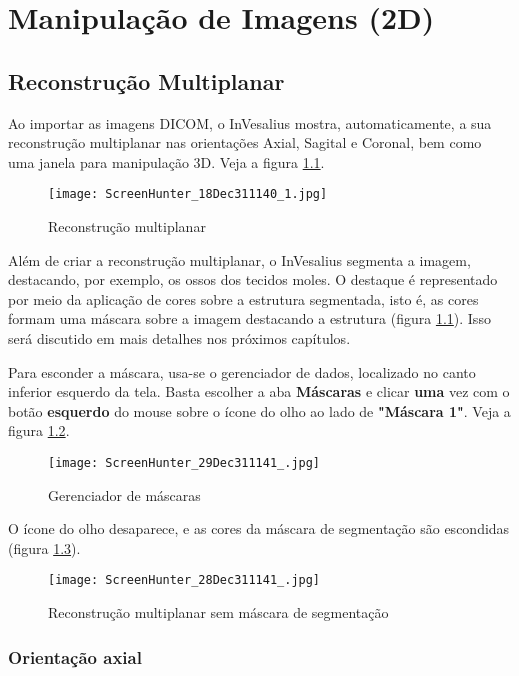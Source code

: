 \chapter{Manipulação de Imagens (2D)}

\section{Reconstrução Multiplanar}

Ao importar as imagens DICOM, o InVesalius mostra, automaticamente, a sua reconstrução
multiplanar nas orientações Axial, Sagital e Coronal, bem como uma janela para manipulação 3D.
Veja a figura \ref{fig:mpr}.

\begin{figure}[!htb]
\centering
\texttt{[image: ScreenHunter\_18Dec311140\_1.jpg]}
\caption{Reconstrução multiplanar}
\label{fig:mpr}
\end{figure}

\newpage

Além de criar a reconstrução multiplanar, o InVesalius segmenta a imagem, destacando, por exemplo, os
ossos dos tecidos moles. O destaque é representado por meio da aplicação de cores sobre a estrutura
segmentada, isto é, as cores formam uma máscara sobre a imagem destacando a estrutura (figura
\ref{fig:mpr}). Isso será discutido em mais detalhes nos próximos capítulos.

Para esconder a máscara, usa-se o gerenciador de dados, localizado no canto inferior esquerdo
da tela. Basta escolher a aba \textbf{Máscaras} e clicar \textbf{uma} vez com o botão
\textbf{esquerdo} do mouse sobre o ícone do olho ao lado de \textbf{"Máscara 1"}. Veja a figura
\ref{fig:ger_masc}.

\begin{figure}[!htb]
\centering
\texttt{[image: ScreenHunter\_29Dec311141\_.jpg]}
\caption{Gerenciador de máscaras}
\label{fig:ger_masc}
\end{figure}

O ícone do olho desaparece, e as cores da máscara de segmentação são escondidas (figura
\ref{fig:mpr_sem_mask}).

\begin{figure}[!htb]
\centering
\texttt{[image: ScreenHunter\_28Dec311141\_.jpg]}
\caption{Reconstrução multiplanar sem máscara de segmentação}
\label{fig:mpr_sem_mask}
\end{figure}

\subsection{Orientação axial}

